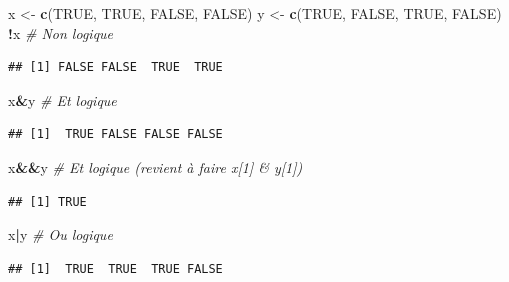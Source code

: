 \documentclass[
  11pt,
]{book}
\newenvironment{Shaded}{\begin{snugshade}}{\end{snugshade}}
\newcommand{\CommentTok}[1]{\textcolor[rgb]{0.56,0.35,0.01}{\textit{#1}}}
\newcommand{\KeywordTok}[1]{\textcolor[rgb]{0.13,0.29,0.53}{\textbf{#1}}}
\newcommand{\NormalTok}[1]{#1}
\newcommand{\OperatorTok}[1]{\textcolor[rgb]{0.81,0.36,0.00}{\textbf{#1}}}
\newcommand{\OtherTok}[1]{\textcolor[rgb]{0.56,0.35,0.01}{#1}}
\newcommand{\StringTok}[1]{\textcolor[rgb]{0.31,0.60,0.02}{#1}}
\numberwithin{equation}{section}
\numberwithin{countremarque}{section}
\begin{document}
\begin{Shaded}
\begin{Highlighting}[]
\NormalTok{x \textless{}{-}}\StringTok{ }\KeywordTok{c}\NormalTok{(}\OtherTok{TRUE}\NormalTok{, }\OtherTok{TRUE}\NormalTok{, }\OtherTok{FALSE}\NormalTok{, }\OtherTok{FALSE}\NormalTok{)}
\NormalTok{y \textless{}{-}}\StringTok{ }\KeywordTok{c}\NormalTok{(}\OtherTok{TRUE}\NormalTok{, }\OtherTok{FALSE}\NormalTok{, }\OtherTok{TRUE}\NormalTok{, }\OtherTok{FALSE}\NormalTok{)}
\OperatorTok{!}\NormalTok{x  }\CommentTok{\# \textquotesingle{}Non\textquotesingle{} logique}
\end{Highlighting}
\end{Shaded}

\begin{lstlisting}
## [1] FALSE FALSE  TRUE  TRUE
\end{lstlisting}

\begin{Shaded}
\begin{Highlighting}[]
\NormalTok{x}\OperatorTok{\&}\NormalTok{y }\CommentTok{\# \textquotesingle{}Et\textquotesingle{} logique}
\end{Highlighting}
\end{Shaded}

\begin{lstlisting}
## [1]  TRUE FALSE FALSE FALSE
\end{lstlisting}

\begin{Shaded}
\begin{Highlighting}[]
\NormalTok{x}\OperatorTok{\&\&}\NormalTok{y    }\CommentTok{\# \textquotesingle{}Et\textquotesingle{} logique (revient à faire x[1] \& y[1])}
\end{Highlighting}
\end{Shaded}

\begin{lstlisting}
## [1] TRUE
\end{lstlisting}

\begin{Shaded}
\begin{Highlighting}[]
\NormalTok{x}\OperatorTok{|}\NormalTok{y }\CommentTok{\# \textquotesingle{}Ou\textquotesingle{} logique}
\end{Highlighting}
\end{Shaded}

\begin{lstlisting}
## [1]  TRUE  TRUE  TRUE FALSE
\end{lstlisting}
\end{document}
